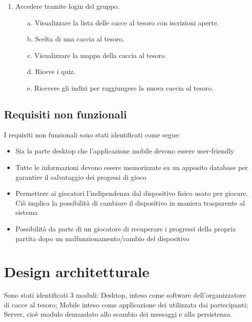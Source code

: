 \documentclass[12pt, italian]{article}
\begin{document}
\begin{itemize}
\begin{enumerate}
			\item Accedere tramite login del gruppo.
			\begin{enumerate}
				\item [a.] Visualizzare la lista delle cacce al tesoro con iscrizioni aperte.
				\item [b.] Scelta di una caccia al tesoro.
				\item [c.] Visualizzare la mappa della caccia al tesoro.
				\item [d.] Riceve i quiz.
				\item [e.] Ricevere gli indizi per raggiungere la nuova caccia al tesoro.
			\end{enumerate}
		\end{enumerate} 
\end{itemize}


\subsection{Requisiti non funzionali}
I requisiti non funzionali sono stati identificati come segue:
\begin{itemize}
	\item Sia la parte desktop che l'applicazione mobile devono essere user-friendly
	\item Tutte le informazioni devono essere memorizzate su un apposito database per garantire il salvataggio dei progessi di gioco
	\item Permettere ai giocatori l'indipendenza dal dispositivo fisico usato per giocare. Ciò implica la possibilità di cambiare il dispositivo in maniera trasparente al sistema
	\item Possibilità da parte di un giocatore di recuperare i progressi della propria partita dopo un malfunzionamento/cambio del dispositivo
\end{itemize}

\newpage
\section{Design architetturale}
Sono stati identificati 3 moduli: Desktop, inteso come software dell'organizzatore di cacce al tesoro; Mobile inteso come applicazione dei utilizzata dai partecipanti; Server, cioè modulo demandato allo scambio dei messaggi e alla persistenza.
\end{document}
